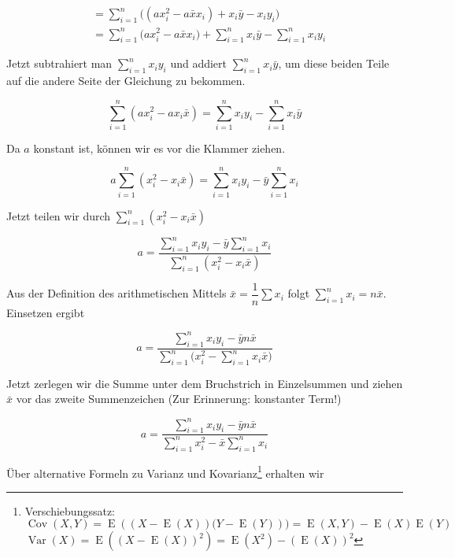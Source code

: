 \documentclass[ngerman, 12pt]{scrartcl}
\def\sm{\sum\limits_{i=1}^{n}}
\DeclareMathOperator{\cov}{Cov}
\DeclareMathOperator{\var}{Var}
\DeclareMathOperator{\E}{E}
\begin{document}
\begin{align}
     &= \sm \big( (ax_i^2 - a\bar{x}x_i) + x_i\bar{y} - x_iy_i \big) \\
     &= \sm \big( ax_i^2 - a\bar{x}x_i \big) + \sm x_i\bar{y} - \sm x_iy_i 
\end{align}

Jetzt subtrahiert man $\sm x_iy_i$ und addiert $\sm x_i\bar{y}$, um diese beiden Teile auf die andere Seite der Gleichung zu bekommen.

\begin{equation}
\sm (ax_i^2 -ax_i\bar{x}) = \sm x_iy_i - \sm x_i\bar{y} 
\end{equation}

Da $a$ konstant ist, können wir es vor die Klammer ziehen.

\begin{equation}
a \sm (x_i^2 -x_i\bar{x}) = \sm x_iy_i - \bar{y} \sm x_i 
\end{equation}

Jetzt teilen wir durch $\sm (x_i^2 -x_i\bar{x})$



\begin{equation}
a =  \dfrac{\sm x_iy_i - \bar{y} \sm x_i}{\sm (x_i^2 -x_i\bar{x})} 
\end{equation}

Aus der Definition des arithmetischen Mittels $\bar{x} = \dfrac{1}{n}\sum x_i$ folgt $\sm x_i= n\bar{x}$. Einsetzen ergibt 

\begin{equation}
a =  \dfrac{\sm x_iy_i - \bar{y} n \bar{x}}{ \sm \big( x_i^2 -  \sm x_i \bar{x} \big)}
\end{equation}


Jetzt zerlegen wir die Summe unter dem Bruchstrich in Einzelsummen und ziehen $\bar{x}$ vor das zweite Summenzeichen (Zur Erinnerung: konstanter Term!)

\begin{equation}
a =  \dfrac{\sm x_iy_i - \bar{y} n\bar{x}}{\sm x_i^2 - \bar{x} \sm x_i}
\end{equation}

Über alternative Formeln zu Varianz und Kovarianz\footnote{Verschiebungssatz: \\ $\cov(X,Y) = \E \left((X - \E(X))(Y - \E(Y)\right)) =\E(X,Y)- \E(X)\E(Y)$ \\ $\var(X)=\E\left(\left(X-\E(X)\right)^2\right)=\E(X^2)-\left(\E(X)\right)^2$} erhalten wir
\end{document}
